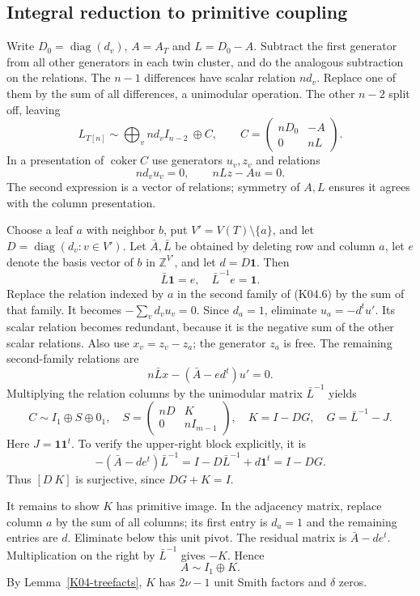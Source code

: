\documentclass[11pt,a4paper]{article}
\theoremstyle{definition}\newtheorem{definition}[theorem]{Definition}
\theoremstyle{remark}\newtheorem{remark}[theorem]{Remark}
\newcommand{\Z}{\mathbb Z}\newcommand{\Q}{\mathbb Q}\newcommand{\F}{\mathbb F}
\DeclareMathOperator{\coker}{coker}\DeclareMathOperator{\diag}{diag}\DeclareMathOperator{\rank}{rank}
\numberwithin{equation}{section}
\begin{document}
\subsection{Integral reduction to primitive coupling}\label{K04-sec-4}
Write $D_0=\diag(d_v)$, $A=A_T$ and $L=D_0-A$. Subtract the first generator from all other generators in each twin cluster, and do the analogous subtraction on the relations. The $n-1$ differences have scalar relation $nd_v$. Replace one of them by the sum of all differences, a unimodular operation. The other $n-2$ split off, leaving
\[
 L_{T[n]}\sim\bigoplus_v nd_vI_{n-2}\ \oplus C,
 \qquad C=\begin{pmatrix}nD_0&-A\\0&nL\end{pmatrix}.          \tag{K04.5}
\]
In a presentation of $\coker C$ use generators $u_v,z_v$ and relations
\[
 nd_vu_v=0,\qquad nLz-Au=0.                                  \tag{K04.6}
\]
The second expression is a vector of relations; symmetry of $A,L$ ensures it agrees with the column presentation.

Choose a leaf $a$ with neighbor $b$, put $V'=V(T)\setminus\{a\}$, and let $D=\diag(d_v:v\in V')$. Let $\bar A,\bar L$ be obtained by deleting row and column $a$, let $e$ denote the basis vector of $b$ in $\Z^{V'}$, and let $d=D\mathbf1$. Then
\[
 \bar L\mathbf1=e,\quad \bar L^{-1}e=\mathbf1.               \tag{K04.7}
\]
Replace the relation indexed by $a$ in the second family of (K04.6) by the sum of that family. It becomes $-\sum_vd_vu_v=0$. Since $d_a=1$, eliminate $u_a=-d^tu'$. Its scalar relation becomes redundant, because it is the negative sum of the other scalar relations. Also use $x_v=z_v-z_a$; the generator $z_a$ is free. The remaining second-family relations are
\[
 n\bar Lx-(\bar A-ed^t)u'=0.                                 \tag{K04.8}
\]
Multiplying the relation columns by the unimodular matrix $\bar L^{-1}$ yields
\[
 C\sim I_1\oplus S\oplus0_1,
 \quad S=\begin{pmatrix}nD&K\\0&nI_{m-1}\end{pmatrix},
 \quad K=I-DG,\quad G=\bar L^{-1}-J.                         \tag{K04.9}
\]
Here $J=\mathbf1\mathbf1^t$. To verify the upper-right block explicitly, it is
\[
 -(\bar A-de^t)\bar L^{-1}
 =I-D\bar L^{-1}+d\mathbf1^t=I-DG.
\]
Thus $[D\ K]$ is surjective, since $DG+K=I$.

It remains to show $K$ has primitive image. In the adjacency matrix, replace column $a$ by the sum of all columns; its first entry is $d_a=1$ and the remaining entries are $d$. Eliminate below this unit pivot. The residual matrix is $\bar A-de^t$. Multiplication on the right by $\bar L^{-1}$ gives $-K$. Hence
\[
 A\sim I_1\oplus K.                                         \tag{K04.10}
\]
By Lemma~\ref{K04-treefacts}, $K$ has $2\nu-1$ unit Smith factors and $\delta$ zeros.
\end{document}
